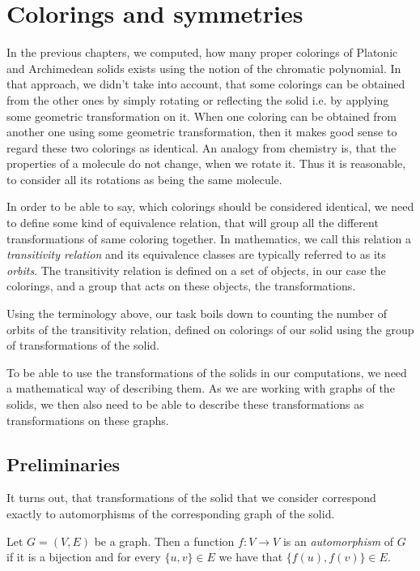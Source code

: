 \chapter{Colorings and symmetries}

In the previous chapters, we computed, how many proper colorings of Platonic and Archimedean solids exists using the notion of the chromatic polynomial. In that approach, we didn't take into account, that some colorings can be obtained from the other ones by simply rotating or reflecting the solid i.e. by applying some geometric transformation on it. When one coloring can be obtained from another one using some geometric transformation, then it makes good sense to regard these two colorings as identical. An analogy from chemistry is, that the properties of a molecule do not change, when we rotate it. Thus it is reasonable, to consider all its rotations as being the same molecule. 

In order to be able to say, which colorings should be considered identical, we need to define some kind of equivalence relation, that will group all the different transformations of same coloring together. In mathematics, we call this relation a \textit{transitivity relation} and its equivalence classes are typically referred to as its \textit{orbits}. The transitivity relation is defined on a set of objects, in our case the colorings, and a group that acts on these objects, the transformations.

Using the terminology above, our task boils down to counting the number of orbits of the transitivity relation, defined on colorings of our solid using the group of transformations of the solid.

To be able to use the transformations of the solids in our computations, we need a mathematical way of describing them. As we are working with graphs of the solids, we then also need to be able to describe these transformations as transformations on these graphs.


\section{Preliminaries}

It turns out, that transformations of the solid that we consider correspond exactly to automorphisms of the corresponding graph of the solid.

\begin{defn}[automorphism]
    Let $G=(V,E)$ be a graph. Then a function $f:V \rightarrow V$ is an \emph{automorphism} of $G$ if it is a bijection and for every $\{u,v\} \in E$ we have that $\{f(u),f(v)\} \in E$.
\end{defn}

